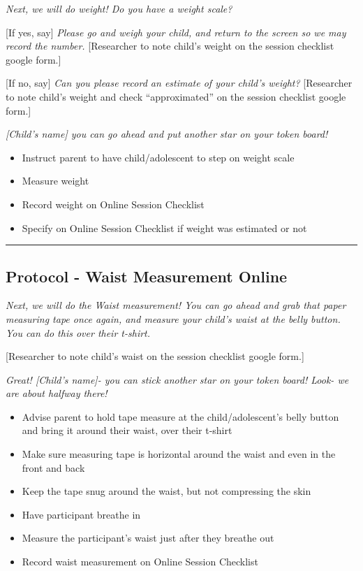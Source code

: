 \documentclass[]{book}
\providecommand{\tightlist}{%
  \setlength{\itemsep}{0pt}\setlength{\parskip}{0pt}}
\begin{document}
\emph{Next, we will do weight! Do you have a weight scale?}

{[}If yes, say{]} \emph{Please go and weigh your child, and return to the screen so we may record the number.} {[}Researcher to note child's weight on the session checklist google form.{]}

{[}If no, say{]} \emph{Can you please record an estimate of your child's weight?} {[}Researcher to note child's weight and check ``approximated'' on the session checklist google form.{]}

\emph{{[}Child's name{]} you can go ahead and put another star on your token board!}

\begin{itemize}
\tightlist
\item
  Instruct parent to have child/adolescent to step on weight scale
\item
  Measure weight
\item
  Record weight on Online Session Checklist
\item
  Specify on Online Session Checklist if weight was estimated or not
\end{itemize}

\begin{center}\rule{0.5\linewidth}{0.5pt}\end{center}

\hypertarget{protocol---waist-measurement-online}{%
\subsection{Protocol - Waist Measurement Online}\label{protocol---waist-measurement-online}}

\emph{Next, we will do the Waist measurement! You can go ahead and grab that paper measuring tape once again, and measure your child's waist at the belly button. You can do this over their t-shirt.}

{[}Researcher to note child's waist on the session checklist google form.{]}

\emph{Great! {[}Child's name{]}- you can stick another star on your token board! Look- we are about halfway there!}

\begin{itemize}
\tightlist
\item
  Advise parent to hold tape measure at the child/adolescent's belly button and bring it around their waist, over their t-shirt
\item
  Make sure measuring tape is horizontal around the waist and even in the front and back
\item
  Keep the tape snug around the waist, but not compressing the skin
\item
  Have participant breathe in
\item
  Measure the participant's waist just after they breathe out
\item
  Record waist measurement on Online Session Checklist
\end{itemize}
\end{document}
